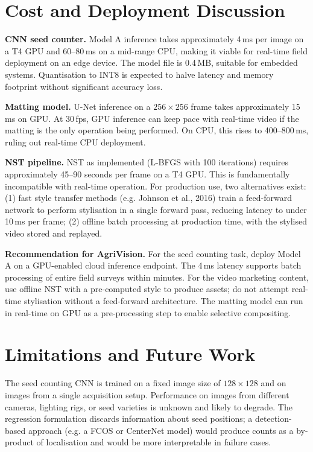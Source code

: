 \section{Cost and Deployment Discussion}
\label{sec:cost}

\textbf{CNN seed counter.} Model A inference takes approximately 4\,ms per image on a
T4 GPU and 60--80\,ms on a mid-range CPU, making it viable for real-time field deployment
on an edge device. The model file is 0.4\,MB, suitable for embedded systems. Quantisation
to INT8 is expected to halve latency and memory footprint without significant accuracy
loss.

\textbf{Matting model.} U-Net inference on a $256\times256$ frame takes approximately
15\,ms on GPU. At 30\,fps, GPU inference can keep pace with real-time video if the matting
is the only operation being performed. On CPU, this rises to 400--800\,ms, ruling out
real-time CPU deployment.

\textbf{NST pipeline.} NST as implemented (L-BFGS with 100 iterations) requires
approximately 45--90 seconds per frame on a T4 GPU. This is fundamentally incompatible
with real-time operation. For production use, two alternatives exist: (1) fast style
transfer methods (e.g. Johnson et al., 2016) train a feed-forward network to perform
stylisation in a single forward pass, reducing latency to under 10\,ms per frame; (2)
offline batch processing at production time, with the stylised video stored and replayed.

\textbf{Recommendation for AgriVision.} For the seed counting task, deploy Model A on
a GPU-enabled cloud inference endpoint. The 4\,ms latency supports batch processing of
entire field surveys within minutes. For the video marketing content, use offline NST
with a pre-computed style to produce assets; do not attempt real-time stylisation without
a feed-forward architecture. The matting model can run in real-time on GPU as a
pre-processing step to enable selective compositing.

\section{Limitations and Future Work}

The seed counting CNN is trained on a fixed image size of $128\times128$ and on images
from a single acquisition setup. Performance on images from different cameras, lighting
rigs, or seed varieties is unknown and likely to degrade. The regression formulation
discards information about seed positions; a detection-based approach (e.g. a FCOS or
CenterNet model) would produce counts as a by-product of localisation and would be more
interpretable in failure cases.

